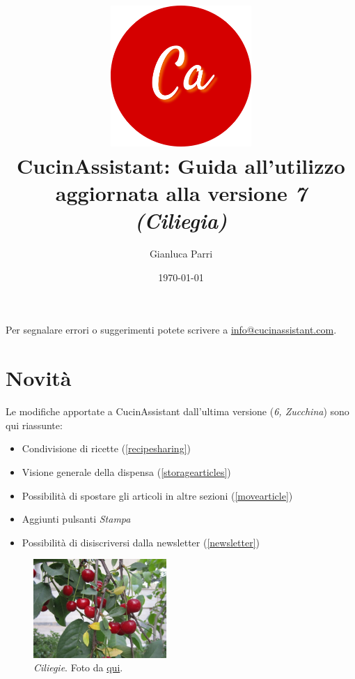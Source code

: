 \documentclass[12pt, a4paper]{report}
\begin{document}
    \title{
        \includegraphics[width=0.4\textwidth]{assets/logo.png}\\
        [1cm]CucinAssistant: Guida all'utilizzo\\
        \large aggiornata alla versione \emph{7 (Ciliegia)}
    }
    \author{Gianluca Parri}
    \date{\today}
    \maketitle



    \tableofcontents
    \vfill
    \noindent Per segnalare errori o suggerimenti potete scrivere a \href{mailto:info@cucinassistant.com}{\mbox{info@cucinassistant.com}}.



    \chapter{Novità}
    
    Le modifiche apportate a CucinAssistant dall'ultima versione (\emph{6, Zucchina}) sono qui riassunte:

    \begin{itemize}
		\item Condivisione di ricette (\ref{recipesharing})
		\item Visione generale della dispensa (\ref{storagearticles})
		\item Possibilità di spostare gli articoli in altre sezioni (\ref{movearticle})
		\item Aggiunti pulsanti \emph{Stampa}
		\item Possibilità di disiscriversi dalla newsletter (\ref{newsletter})
    \end{itemize}

    \begin{figure}[H]
        \centering
        \includegraphics[width=0.45\textwidth]{assets/ciliegie.jpg}
		\caption{\emph{Ciliegie}. Foto da \href{https://upload.wikimedia.org/wikipedia/commons/9/94/Black_Che.jpg}{qui}.}
    \end{figure}
\end{document}
